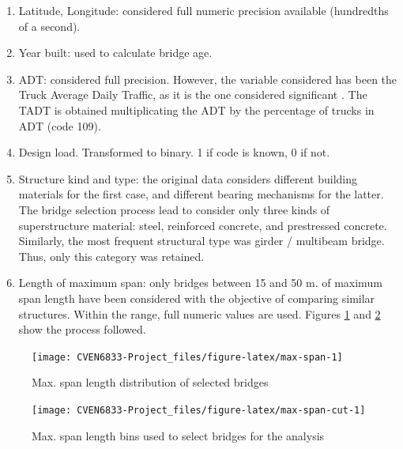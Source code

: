 \documentclass[]{book}
\theoremstyle{definition}
\theoremstyle{definition}
\theoremstyle{definition}
\theoremstyle{remark}
\begin{document}
\begin{enumerate}
\def\labelenumi{\arabic{enumi}.}
\item
  Latitude, Longitude: considered full numeric precision available
  (hundredths of a second).
\item
  Year built: used to calculate bridge age.
\item
  ADT: considered full precision. However, the variable considered has
  been the Truck Average Daily Traffic, as it is the one considered
  significant \citep{saeedPerformanceEvaluationLife2017}. The TADT is
  obtained multiplicating the ADT by the percentage of trucks in ADT
  (code 109).
\item
  Design load. Transformed to binary. 1 if code is known, 0 if not.
\item
  Structure kind and type: the original data considers different
  building materials for the first case, and different bearing
  mechanisms for the latter. The bridge selection process lead to
  consider only three kinds of superstructure material: steel,
  reinforced concrete, and prestressed concrete. Similarly, the most
  frequent structural type was girder / multibeam bridge. Thus, only
  this category was retained.
\item
  Length of maximum span: only bridges between 15 and 50 m. of maximum
  span length have been considered with the objective of comparing
  similar structures. Within the range, full numeric values are used.
  Figures \ref{fig:max-span} and \ref{fig:max-span-cut} show the process
  followed.
\end{enumerate}

\begin{figure}

{\centering \texttt{[image: CVEN6833-Project\_files/figure-latex/max-span-1]} 

}

\caption{Max. span length distribution of selected bridges}\label{fig:max-span}
\end{figure}\begin{figure}

{\centering \texttt{[image: CVEN6833-Project\_files/figure-latex/max-span-cut-1]} 

}

\caption{Max. span length bins used to select bridges for the analysis}\label{fig:max-span-cut}
\end{figure}
\end{document}

